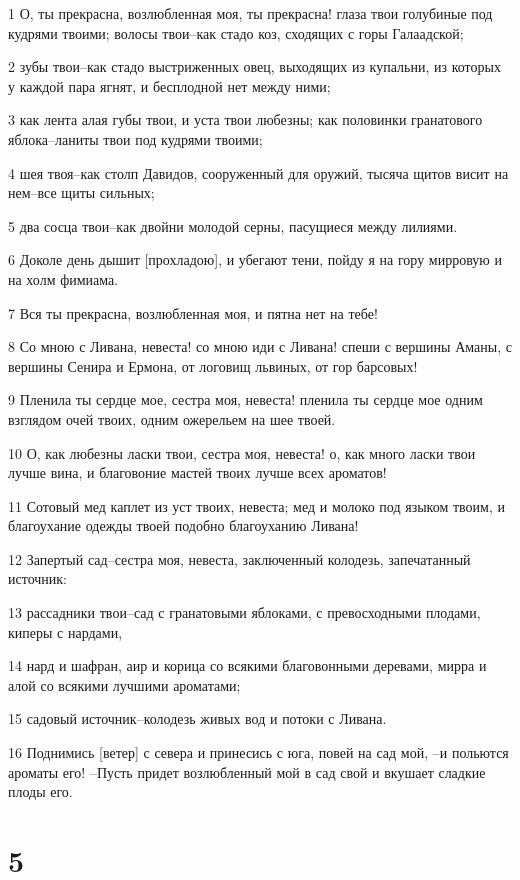 \par 1 О, ты прекрасна, возлюбленная моя, ты прекрасна! глаза твои голубиные под кудрями твоими; волосы твои--как стадо коз, сходящих с горы Галаадской;
\par 2 зубы твои--как стадо выстриженных овец, выходящих из купальни, из которых у каждой пара ягнят, и бесплодной нет между ними;
\par 3 как лента алая губы твои, и уста твои любезны; как половинки гранатового яблока--ланиты твои под кудрями твоими;
\par 4 шея твоя--как столп Давидов, сооруженный для оружий, тысяча щитов висит на нем--все щиты сильных;
\par 5 два сосца твои--как двойни молодой серны, пасущиеся между лилиями.
\par 6 Доколе день дышит [прохладою], и убегают тени, пойду я на гору мирровую и на холм фимиама.
\par 7 Вся ты прекрасна, возлюбленная моя, и пятна нет на тебе!
\par 8 Со мною с Ливана, невеста! со мною иди с Ливана! спеши с вершины Аманы, с вершины Сенира и Ермона, от логовищ львиных, от гор барсовых!
\par 9 Пленила ты сердце мое, сестра моя, невеста! пленила ты сердце мое одним взглядом очей твоих, одним ожерельем на шее твоей.
\par 10 О, как любезны ласки твои, сестра моя, невеста! о, как много ласки твои лучше вина, и благовоние мастей твоих лучше всех ароматов!
\par 11 Сотовый мед каплет из уст твоих, невеста; мед и молоко под языком твоим, и благоухание одежды твоей подобно благоуханию Ливана!
\par 12 Запертый сад--сестра моя, невеста, заключенный колодезь, запечатанный источник:
\par 13 рассадники твои--сад с гранатовыми яблоками, с превосходными плодами, киперы с нардами,
\par 14 нард и шафран, аир и корица со всякими благовонными деревами, мирра и алой со всякими лучшими ароматами;
\par 15 садовый источник--колодезь живых вод и потоки с Ливана.
\par 16 Поднимись [ветер] с севера и принесись с юга, повей на сад мой, --и польются ароматы его! --Пусть придет возлюбленный мой в сад свой и вкушает сладкие плоды его.

\chapter{5}

